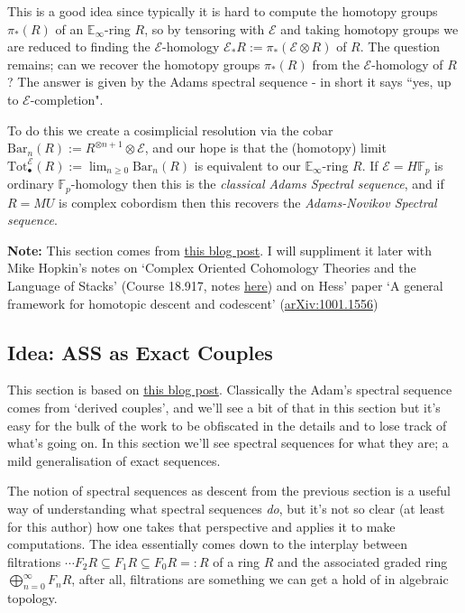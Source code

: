 This is a good idea since typically it is hard to compute the homotopy groups $\pi_\ast(R)$ of an $\mathbb{E}_\infty$-ring $R$, so by tensoring with $\mathcal{E}$ and taking homotopy groups we are reduced to finding the $\mathcal{E}$-homology $\mathcal{E}_\ast R:= \pi_\ast(\mathcal{E}\otimes R)$ of $R$. The question remains; can we recover the homotopy groups $\pi_\ast(R)$ from the $\mathcal{E}$-homology of $R$? The answer is given by the Adams spectral sequence - in short it says ``yes, up to $\mathcal{E}$-completion".

To do this we create a cosimplicial resolution via the cobar $\text{Bar}_n(R) := R^{\otimes n+1} \otimes \mathcal{E}$, and our hope is that the (homotopy) limit $\text{Tot}^\mathcal{E}_\bullet(R) := \lim_{n\geq0}\text{Bar}_n(R)$ is equivalent to our $\mathbb{E}_\infty$-ring $R$. If $\mathcal{E} = H\mathbb{F}_p$ is ordinary $\mathbb{F}_p$-homology then this is the \textit{classical Adams Spectral sequence}, and if $R = MU$ is complex cobordism then this recovers the \textit{Adams-Novikov Spectral sequence}. 


{\color{orange}
	\textbf{Note:} This section comes from \href{https://amathew.wordpress.com/2012/09/21/3844/}{this blog post}. I will suppliment it later with Mike Hopkin's notes on `Complex Oriented Cohomology Theories and the Language of Stacks' (Course 18.917, notes \href{https://ncatlab.org/nlab/files/HopkinsLecture.pdf}{here}) and on Hess' paper `A general framework for homotopic descent and codescent' (\href{https://arxiv.org/abs/1001.1556}{arXiv:1001.1556})
}



\newpage
\subsection{Idea: ASS as Exact Couples}
This section is based on \href{https://ncatlab.org/nlab/show/spectral+sequences+in+homotopy+type+theory}{this blog post}. Classically the Adam's spectral sequence comes from `derived couples', and we'll see a bit of that in this section but it's easy for the bulk of the work to be obfiscated in the details and to lose track of what's going on. In this section we'll see spectral sequences for what they are; a mild generalisation of exact sequences. 

The notion of spectral sequences as descent from the previous section is a useful way of understanding what spectral sequences \textit{do}, but it's not so clear (at least for this author) how one takes that perspective and applies it to make computations. The idea essentially comes down to the interplay between filtrations $\cdots F_2R \subseteq F_1R \subseteq F_0R =: R$ of a ring $R$ and the associated graded ring $\bigoplus_{n=0}^\infty F_nR$, after all, filtrations are something we can get a hold of in algebraic topology. 

